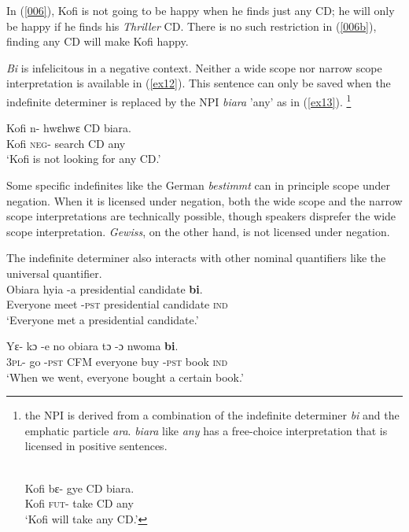 \documentclass[output=paper,modfonts]{langsci/langscibook}
\begin{document}
In (\ref{006}), Kofi is not going to be happy when he finds just any CD; he will only be happy if he finds his \emph{Thriller} CD. There is no such restriction in (\ref{006b}), finding any CD will make Kofi happy.

\emph{Bi} is infelicitous in a negative context. Neither a wide scope nor narrow scope interpretation is available in (\ref{ex12}). This sentence can only be saved when the indefinite determiner is replaced by the NPI \emph{biara} 'any' as in (\ref{ex13}). \footnote{the NPI is derived from a combination of the indefinite determiner \emph{bi} and the emphatic particle \emph{ara}. \emph{biara} like \emph{any} has a free-choice interpretation that is licensed in positive sentences.

\ea
{}\\
\label{ex120}
\gll  Kofi  bε- gye CD biara.\\
Kofi \textsc{fut}-  take CD any \\
\glt `Kofi will take any CD.'
\z 
}  
\ea
{}\\


\ex\label{ex13}
\gll  Kofi n- hwεhwε CD biara.\\
Kofi \textsc{neg}-  search CD any \\
\glt `Kofi is not looking for any CD.'
\z \z 

Some specific indefinites like the German \emph{bestimmt} can in principle scope under negation. When it is licensed under negation, both the wide scope and the narrow scope interpretations are technically possible, though speakers disprefer the wide scope interpretation. \emph{Gewiss}, on the other hand, is not licensed under negation.

The indefinite determiner also interacts with other nominal quantifiers like the universal quantifier. 
\ea 
{}\\
  \ea\label{ex100}
\gll Obiara hyia -a presidential candidate  \textbf{bi}. \\
    Everyone meet -\textsc{pst} presidential candidate \textsc{ind} \\
\glt `Everyone met a presidential candidate.'

\ex\label{ex15}
\gll  Yε- kɔ -e no obiara tɔ -ɔ  nwoma \textbf{bi}.\\
3\textsc{pl}- go -\textsc{pst}  CFM everyone buy -\textsc{pst} book \textsc{ind} \\
\glt `When we went, everyone bought a certain book.'
\z \z
 
\end{document}
